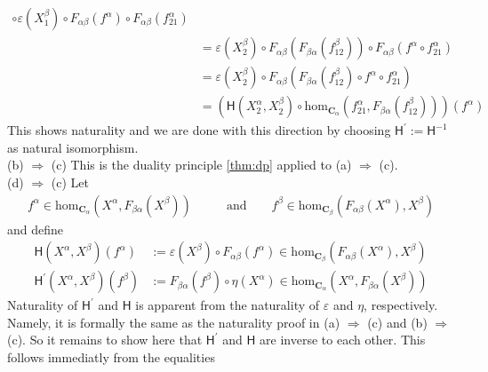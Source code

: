 \begin{prf}
\begin{align*}
  \circ
  \varepsilon(X_{1}^{\beta})
  \circ
  F_{\alpha\beta}(f^{\alpha})
  \circ
  F_{\alpha\beta}(f_{21}^{\alpha})
  \\
  &=
  \varepsilon(X_{2}^{\beta})
  \circ
  F_{\alpha\beta}
  \left(
    F_{\beta\alpha}(f_{12}^{\beta})
  \right)
  \circ
  F_{\alpha\beta}(f^{\alpha} \circ f_{21}^{\alpha})
  \tag{NT}
  \\
  &=
  \varepsilon(X_{2}^{\beta})
  \circ
  F_{\alpha\beta}
  \left(
    F_{\beta\alpha}(f_{12}^{\beta})
    \circ
    f^{\alpha}
    \circ
    f_{21}^{\alpha}
  \right)
  \\
  &=
  \left(
    \mathsf{H}(X_{2}^{\alpha},X_{2}^{\beta})
    \circ
    \mathrm{hom}_{\mathbf{C}_{\alpha}}
    \left(
      f_{21}^{\alpha},
      F_{\beta\alpha}(f_{12}^{\beta})
    \right)
  \right)
  (f^{\alpha})
\end{align*}
This shows naturality and we are done with this direction by choosing $\mathsf{H}^{\prime} := \mathsf{H}^{-1}$ as natural isomorphism.
\\
{\glqq}(b) $\Rightarrow$ (c){\grqq}
\qquad
This is the duality principle \ref{thm:dp} applied to {\glqq}(a) $\Rightarrow$ (c){\grqq}.
\\
{\glqq}(d) $\Rightarrow$ (c){\grqq}
\qquad
Let
\begin{align*}
  f^{\alpha}
  \in
  \mathrm{hom}_{\mathbf{C}_{\alpha}}
  \left(
    X^{\alpha},
    F_{\beta\alpha}(X^{\beta})
  \right)
  \qquad
  &\text{and}
  \qquad
  f^{\beta}
  \in
  \mathrm{hom}_{\mathbf{C}_{\beta}}
  \left(
    F_{\alpha\beta}(X^{\alpha}),
    X^{\beta}
  \right)
\end{align*}
and define
\begin{align*}
  \mathsf{H}(X^{\alpha},X^{\beta})(f^{\alpha})
  &:=
  \varepsilon(X^{\beta})
  \circ
  F_{\alpha\beta}(f^{\alpha})
  \in
  \mathrm{hom}_{\mathbf{C}_{\beta}}
  \left(
    F_{\alpha\beta}(X^{\alpha}),
    X^{\beta}
  \right)
  \\
  \mathsf{H}^{\prime}(X^{\alpha},X^{\beta})(f^{\beta})
  &:=
  F_{\beta\alpha}(f^{\beta})
  \circ
  \eta(X^{\alpha})
  \in
  \mathrm{hom}_{\mathbf{C}_{\alpha}}
  \left(
    X^{\alpha},
    F_{\beta\alpha}(X^{\beta})
  \right)
\end{align*}
Naturality of $\mathsf{H}^{\prime}$ and $\mathsf{H}$ is apparent from the naturality of $\varepsilon$ and $\eta$, respectively. Namely, it is formally the same as the naturality proof in {\glqq}(a) $\Rightarrow$ (c){\grqq} and {\glqq}(b) $\Rightarrow$ (c){\grqq}. So it remains to show here that $\mathsf{H}^{\prime}$ and $\mathsf{H}$ are inverse to each other. This follows immediatly from the equalities

\end{prf}
